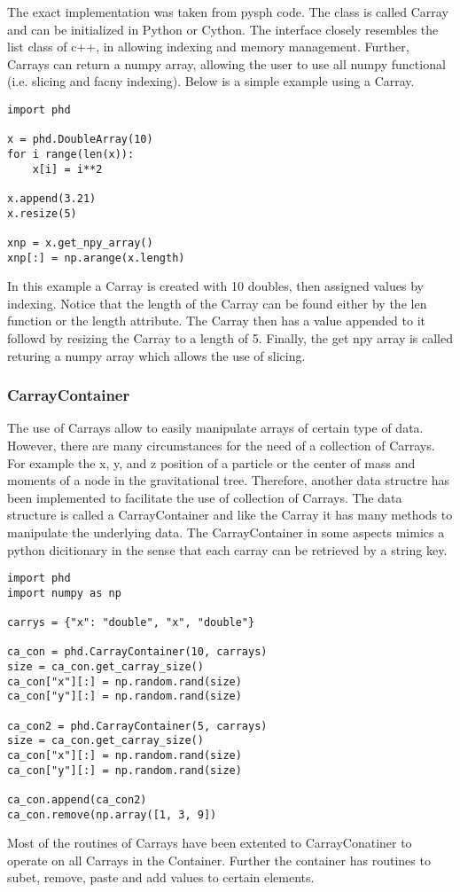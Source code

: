 The exact implementation was taken from pysph code. The class is called Carray and
can be initialized in Python or Cython. The interface closely resembles the list
class of c++, in allowing indexing and memory management. Further, Carrays can return
a numpy array, allowing the user to use all numpy functional (i.e. slicing and facny indexing). 
Below is a simple example using a Carray.
\begin{lstlisting}
import phd

x = phd.DoubleArray(10)
for i range(len(x)):
	x[i] = i**2
    
x.append(3.21)
x.resize(5)

xnp = x.get_npy_array()
xnp[:] = np.arange(x.length)
\end{lstlisting}
In this example a Carray is created with 10 doubles, then assigned values by indexing. Notice
that the length of the Carray can be found either by the len function or the length
attribute. The Carray then has a value appended to it followd by resizing the Carray to a length
of 5. Finally, the get npy array is called returing a numpy array which allows the use of slicing.

\subsubsection{CarrayContainer}
The use of Carrays allow to easily manipulate arrays of certain type of data. However, there are
many circumstances for the need of a collection of Carrays. For example the x, y, and z position
of a particle or the center of mass and moments of a node in the gravitational tree. Therefore,
another data structre has been implemented to facilitate the use of collection of Carrays. The data
structure is called a CarrayContainer and like the Carray it has many methods to manipulate the
underlying data. The CarrayContainer in some aspects mimics a python dicitionary in the sense
that each carray can be retrieved by a string key.
\begin{lstlisting}
import phd
import numpy as np

carrys = {"x": "double", "x", "double"}

ca_con = phd.CarrayContainer(10, carrays)
size = ca_con.get_carray_size()
ca_con["x"][:] = np.random.rand(size)
ca_con["y"][:] = np.random.rand(size)

ca_con2 = phd.CarrayContainer(5, carrays)
size = ca_con.get_carray_size()
ca_con["x"][:] = np.random.rand(size)
ca_con["y"][:] = np.random.rand(size)

ca_con.append(ca_con2)
ca_con.remove(np.array([1, 3, 9])
\end{lstlisting}
Most of the routines of Carrays have been extented to CarrayConatiner to operate on
all Carrays in the Container. Further the container has routines to subet, remove, paste
and add values to certain elements.


